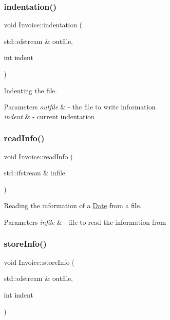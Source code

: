 \subsubsection{\texorpdfstring{indentation()}{indentation()}}
{\footnotesize\ttfamily void Invoice\+::indentation (\begin{DoxyParamCaption}\item[{std\+::ofstream \&}]{outfile,  }\item[{int}]{indent }\end{DoxyParamCaption})}



Indenting the file. 


\begin{DoxyParams}{Parameters}
{\em outfile} & -\/ the file to write information \\
\hline
{\em indent} & -\/ current indentation \\
\hline
\end{DoxyParams}
\mbox{\label{class_invoice_aae19e485510f08c56be425b4634246ed}} 
\subsubsection{\texorpdfstring{read\+Info()}{readInfo()}}
{\footnotesize\ttfamily void Invoice\+::read\+Info (\begin{DoxyParamCaption}\item[{std\+::ifstream \&}]{infile }\end{DoxyParamCaption})}



Reading the information of a \mbox{\hyperlink{class_date}{Date}} from a file. 


\begin{DoxyParams}{Parameters}
{\em infile} & -\/ file to read the information from \\
\hline
\end{DoxyParams}
\mbox{\label{class_invoice_a326f9548d517f1f432939e0c8231a84e}} 
\subsubsection{\texorpdfstring{store\+Info()}{storeInfo()}}
{\footnotesize\ttfamily void Invoice\+::store\+Info (\begin{DoxyParamCaption}\item[{std\+::ofstream \&}]{outfile,  }\item[{int}]{indent }\end{DoxyParamCaption})}



